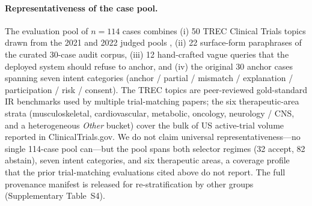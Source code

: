 \documentclass[11pt]{article}
\begin{document}
\paragraph{Representativeness of the case pool.}
The evaluation pool of $n=114$ cases combines (i) 50 TREC Clinical Trials topics drawn from the 2021 and 2022 judged pools \citep{roberts2021trec,soboroff2022trec}, (ii) 22 surface-form paraphrases of the curated 30-case audit corpus, (iii) 12 hand-crafted vague queries that the deployed system should refuse to anchor, and (iv) the original 30 anchor cases spanning seven intent categories (anchor / partial / mismatch / explanation / participation / risk / consent). The TREC topics are peer-reviewed gold-standard IR benchmarks used by multiple trial-matching papers; the six therapeutic-area strata (musculoskeletal, cardiovascular, metabolic, oncology, neurology / CNS, and a heterogeneous \emph{Other} bucket) cover the bulk of US active-trial volume reported in ClinicalTrials.gov. We do not claim universal representativeness---no single 114-case pool can---but the pool spans both selector regimes (32 accept, 82 abstain), seven intent categories, and six therapeutic areas, a coverage profile that the prior trial-matching evaluations cited above do not report. The full provenance manifest is released for re-stratification by other groups (Supplementary Table~S4).
\end{document}
